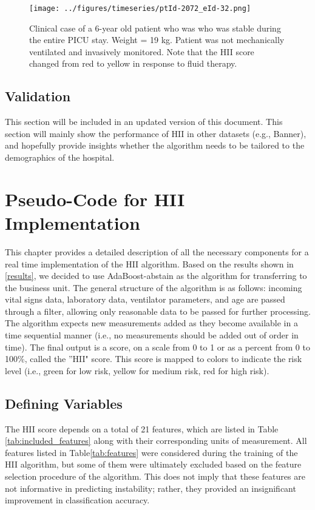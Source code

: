 \documentclass[
   technote
]{phildoc}
\newcommand{\ie}{i.e.,}
\newcommand{\eg}{e.g.,}
\newcommand{\hii}{HII}
\newcommand{\tab}{Table}
\begin{document}
\begin{itemize}
\begin{figure}[h!]
	\centering
	\texttt{[image: ../figures/timeseries/ptId-2072\_eId-32.png]}
	\caption{Clinical case of a 6-year old patient who was who was stable during the entire PICU stay. Weight = 19 kg. Patient was not mechanically ventilated and invasively monitored. Note that the \hii{} score changed from red to yellow in response to fluid therapy.}  
	\label{fig:clinical_case_ptId2072}      
\end{figure}

\end{itemize}


\section{Validation}
This section will be included in an updated version of this document. This section will mainly show the performance of \hii{} in other datasets (\eg{} Banner), and hopefully provide insights whether the algorithm needs to be tailored to the demographics of the hospital. 


\chapter{Pseudo-Code for HII Implementation}
\label{pseudocode}
This chapter provides a detailed description of all the necessary components for a real time implementation of the \hii{} algorithm. Based on the results shown in \ref{results}, we decided to use AdaBoost-abstain as the algorithm for transferring to the business unit. The general structure of the algorithm is as follows: incoming vital signs data, laboratory data, ventilator parameters, and age  are passed through a filter, allowing only reasonable data to be passed for further processing. The algorithm expects new measurements added as they become available in a time sequential manner (\ie{} no measurements should be added out of order in time). The final output is a score, on a scale from 0 to 1 or as a percent from 0 to 100\%, called the ''HII" score. This score is mapped to colors to indicate the risk level (\ie{} green for low risk, yellow for medium risk, red for high risk).      

\section{Defining Variables}
The \hii{} score depends on a total of 21 features, which are listed in \tab{} \ref{tab:included_features} along with their corresponding units of measurement. All features listed in \tab{}\ref{tab:features} were considered during the training of the \hii{} algorithm, but some of them were ultimately excluded based on the feature selection procedure of the algorithm. This does not imply that these features are not informative in predicting instability; rather, they provided an insignificant improvement in classification accuracy.
\end{document}
